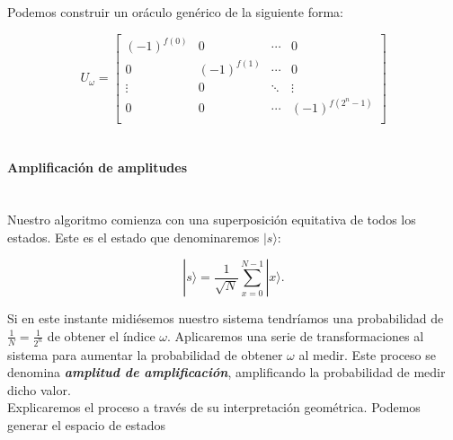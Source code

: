 \documentclass[11pt]{article}
\newcommand{\ra}{\rangle}
\newcommand{\myparagraph}[1]{\paragraph*{ \\ #1}\mbox{}\\}
\theoremstyle{plain}
\begin{document}
Podemos construir un oráculo genérico de la siguiente forma:

\[
	U_\omega = 
	\begin{bmatrix}
	(-1)^{f(0)} &   0         & \cdots &   0         \\
	0           & (-1)^{f(1)} & \cdots &   0         \\
	\vdots      &   0         & \ddots & \vdots      \\
	0           &   0         & \cdots & (-1)^{f(2^n-1)} \\
	\end{bmatrix}
\]

\myparagraph{Amplificación de amplitudes}

Nuestro algoritmo comienza con una superposición equitativa de todos los estados. Este es el estado que denominaremos $|s\ra$:

\[
	|s\ra = \frac{1}{\sqrt N} \sum_{x = 0}^{N-1} |x\ra.
\]

Si en este instante midiésemos nuestro sistema tendríamos una probabilidad de $\frac{1}{N} = \frac{1}{2^n}$ de obtener el índice $\omega$. Aplicaremos una serie de transformaciones al sistema para aumentar la probabilidad de obtener $\omega$ al medir. Este proceso se denomina \emph{\textbf{amplitud de amplificación}}, amplificando la probabilidad de medir dicho valor. \\

Explicaremos el proceso a través de su interpretación geométrica. Podemos generar el espacio de estados 
\end{document}
